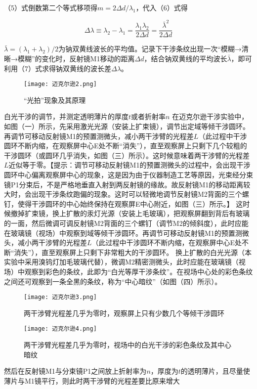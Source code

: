 \documentclass[dvipsnames, svgnames,a4paper,11pt]{article}
\begin{document}
\begin{question}
（5）式倒数第二个等式移项得\(m = 2\Delta d/\lambda_1\)，代入（6）式得

\[ 
\Delta \lambda \equiv \lambda_2 - \lambda_1 = \frac{\lambda_1\lambda_2}{2\Delta d} = \frac{\bar{\lambda}^2}{2\Delta d} \tag{7} 
\]

\(\bar{\lambda} = (\lambda_1 + \lambda_2)/2\)为钠双黄线波长的平均值。记录下干涉条纹出现一次“模糊→清晰→模糊”的变化时，反射镜M1移动的距离\(\Delta d\)，结合钠双黄线的平均波长\(\bar{\lambda}\)，即可利用（7）式求得钠双黄线的波长差\(\Delta \lambda\)。
	\begin{figure}[H]
		\centering
		\texttt{[image: 迈克尔逊2.png]}
		\caption{“光拍”现象及其原理}
	\end{figure}
\end{question}

\begin{question}
	白光干涉的调节，并测定透明薄片的厚度$t$或者折射率$n$
	\tcblower
	在迈克尔逊干涉实验中，如图（一）所示，先采用激光光源（安装上扩束镜），调节出定域等倾干涉圆环。再调节可移动反射镜M1的预置测微头，减小两干涉臂的光程差\(L\)（此过程中干涉圆环不断内缩，在观察屏中心E处不断“消失”），直至观察屏上只剩下几个较粗的干涉圆环（或圆环几乎消失，如图（三）所示）。这时候意味着两干涉臂的光程差\(L\)近似等于零。【提示：调节可移动反射镜M1的预置测微头的过程中，会出现干涉圆环中心偏离观察屏中心的现象，这是因为由于仪器制造工艺等原因，光束经分束镜P1分束后，不是严格地垂直入射到两反射镜的缘故。故反射镜M1的移动距离较大时，会出现干涉条纹跑偏的现象。这时可以轻微地调节反射镜M2背面的三个螺钉，使得干涉圆环的中心始终保持在观察屏E中心附近，如图（三）所示。】
	这时候撤掉扩束镜，换上扩散的汞灯光源（安装上毛玻璃），把观察屏翻到背后有玻璃的一面，然后微调可调反射镜M2背面的三个螺钉（调节M2的倾斜度），此时应能在玻璃镜（视场）中观察到域等倾干涉圆环。再调节可移动反射镜M1的预置测微头，减小两干涉臂的光程差\(L\)（此过程中干涉圆环不断内缩，在观察屏中心E处不断“消失”），直至观察屏上只剩下非常粗大的干涉圆环。
	换上扩散的白光光源（本实验中采用溴钨灯加毛玻璃代替），微调M2精密测微头，此时应能在玻璃镜（视场）中观察到彩色的条纹，此即为“白光等厚干涉条纹”。在视场中心处的彩色条纹之间还可观察到一条全黑的条纹，称为“中心暗纹”（如图（四）所示）。
	\begin{figure}[H]
		\centering
		\texttt{[image: 迈克尔逊3.png]}
		\caption{两干涉臂光程差几乎为零时，观察屏上只有少数几个等倾干涉圆环}
	\end{figure}
	\begin{figure}[H]
		\centering
		\texttt{[image: 迈克尔逊4.png]}
		\caption{两干涉臂光程差几乎为零时，视场中的白光干涉的彩色条纹及其中心暗纹}
	\end{figure}
	然后在反射镜M1与分束镜P1之间放上折射率为\(n\)，厚度为\(t\)的透明薄片，且尽量使薄片与M1镜平行，则此时两干涉臂的光程差要比原来增大


\end{question}
\end{document}
